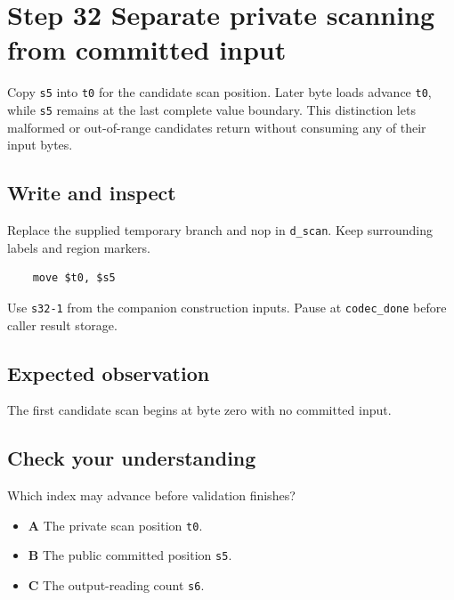 \section{Step 32 Separate private scanning from committed input}\label{delta-s32}

Copy \texttt{s5} into \texttt{t0} for the candidate scan position. Later byte loads advance \texttt{t0}, while \texttt{s5} remains at the last complete value boundary. This distinction lets malformed or out-of-range candidates return without consuming any of their input bytes.

\subsection{Write and inspect}
Replace the supplied temporary branch and nop in \texttt{d\_scan}. Keep surrounding labels and region markers.

\begin{verbatim}
    move $t0, $s5
\end{verbatim}
Use \texttt{s32-1} from the companion construction inputs. Pause at \texttt{codec\_done} before caller result storage.

\subsection{Expected observation}
The first candidate scan begins at byte zero with no committed input.

\subsection{Check your understanding}
Which index may advance before validation finishes?

\begin{itemize}
  \item \textbf{A} The private scan position \texttt{t0}.
  \item \textbf{B} The public committed position \texttt{s5}.
  \item \textbf{C} The output-reading count \texttt{s6}.
\end{itemize}
